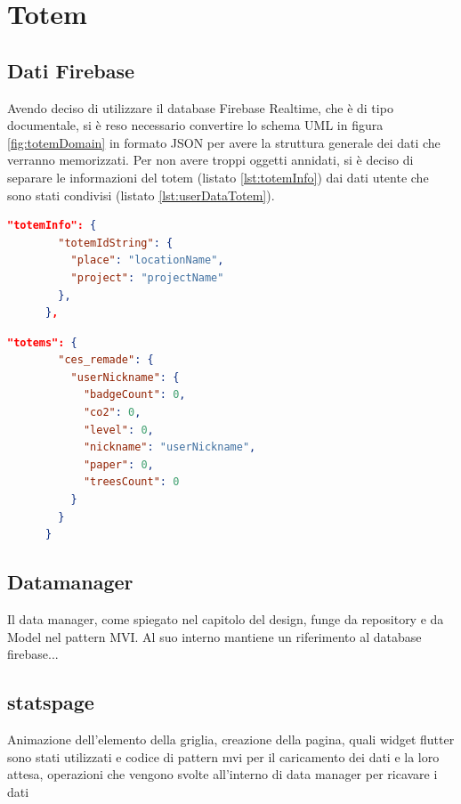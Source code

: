 \section{Totem}
\subsection{Dati Firebase}

Avendo deciso di utilizzare il database Firebase Realtime, che è di tipo documentale, si è reso necessario convertire lo schema UML in figura \ref{fig:totemDomain} in formato JSON per avere la struttura generale dei dati che verranno memorizzati.
Per non avere troppi oggetti annidati, si è deciso di separare le informazioni del totem (listato \ref{lst:totemInfo}) dai dati utente che sono stati condivisi (listato \ref{lst:userDataTotem}).

\begin{lstlisting}[language=json, caption={Oggetto JSON contenente le informazioni sui totem}, label={lst:totemInfo}]
    "totemInfo": {
        "totemIdString": {
          "place": "locationName",
          "project": "projectName"
        },
      },
\end{lstlisting}  

\begin{lstlisting}[language=json, caption={Scheletro dell'oggetto JSON che memorizza i dati utente per ciascun Totem}, label={lst:userDataTotem}]
      "totems": {
        "ces_remade": {
          "userNickname": {
            "badgeCount": 0,
            "co2": 0,
            "level": 0,
            "nickname": "userNickname",
            "paper": 0,
            "treesCount": 0
          }
        }
      }
\end{lstlisting}

\subsection{Datamanager}
Il data manager, come spiegato nel capitolo del design, funge da repository e da Model nel pattern MVI.
Al suo interno mantiene un riferimento al database firebase...



\subsection{statspage}
Animazione dell'elemento della griglia, creazione della pagina, quali widget flutter sono stati utilizzati e codice di pattern mvi per il caricamento dei dati e la loro attesa, operazioni che vengono svolte all'interno di data manager per ricavare i dati
